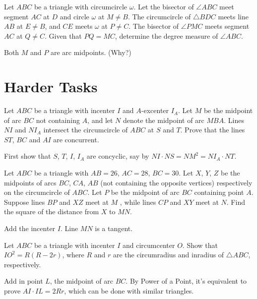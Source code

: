 \documentclass[11pt]{scrartcl}
\begin{document}
\begin{problem}
  Let $ABC$ be a triangle with circumcircle $\omega$.
  Let the bisector of $\angle ABC$ meet segment $AC$ at $D$ and circle $\omega$ at $M\neq B$.
  The circumcircle of $\triangle BDC$ meets line $AB$ at $E \neq B$,
  and $CE$ meets $\omega$ at $P\neq C$.
  The bisector of $\angle PMC$ meets segment $AC$ at $Q \neq C$.
  Given that $PQ = MC$, determine the degree measure of $\angle ABC$.
  \begin{hint}
    Both $M$ and $P$ are arc midpoints. (Why?)
  \end{hint}
\end{problem}


\section{Harder Tasks}
\begin{problem}
  [Iran 2001] Let $ABC$ be a triangle with incenter $I$ and $A$-excenter $I_A$.
  Let $M$ be the midpoint of arc $BC$ not containing $A$, and let $N$ denote the midpoint of arc $MBA$.
  Lines $NI$ and $NI_A$ intersect the circumcircle of $ABC$ at $S$ and $T$.
  Prove that the lines $ST$, $BC$ and $AI$ are concurrent.
  \begin{hint}
    First show that $S$, $T$, $I$, $I_A$ are concyclic, say by $NI \cdot NS = NM^2 = NI_A \cdot NT$.
  \end{hint}
\end{problem}

\begin{problem}
   Let $ABC$ be a triangle with $AB=26$, $AC=28$, $BC=30$.
  Let $X$, $Y$, $Z$ be the midpoints of arcs $BC$, $CA$, $AB$ (not containing the opposite vertices)
  respectively on the circumcircle of $ABC$.
  Let $P$ be the midpoint of arc $BC$ containing point $A$.
  Suppose lines $BP$ and $XZ$ meet at $M$ , while lines $CP$ and $XY$ meet at $N$.
  Find the square of the distance from $X$ to $MN$.
  \begin{hint}
    Add the incenter $I$.
    Line $MN$ is a tangent.
  \end{hint}
\end{problem}

\begin{problem}
  [Euler]
  Let $ABC$ be a triangle with incenter $I$ and circumcenter $O$.
  Show that $IO^2 = R(R-2r)$, where $R$ and $r$ are the circumradius and inradius of $\triangle ABC$, respectively.
  \begin{hint}
    Add in point $L$, the midpoint of arc $BC$.
    By Power of a Point, it's equivalent to prove $AI \cdot IL = 2Rr$,
    which can be done with similar triangles.
  \end{hint}
\end{problem}
\end{document}
